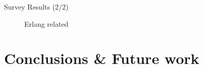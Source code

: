 \begin{frame}{Survey Results (2/2)}
  \begin{figure}
    \centering
    \caption{Erlang related}
  \end{figure}
\end{frame}

\section{Conclusions \& Future work}

